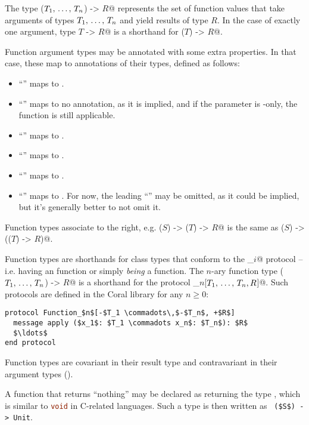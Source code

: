 The type \lstinline@($T_1 ,\, \ldots ,\, T_n$) -> $R$@ represents the set of function values that take arguments of types $T_1 ,\, \ldots ,\, T_n$ and yield results of type $R$. In the case of exactly one argument, type \lstinline@$T$ -> $R$@ is a shorthand for \lstinline@($T$) -> $R$@. 

Function argument types may be annotated with some extra properties. In that case, these map to annotations of their types, defined as follows:
\begin{itemize}
\item ``'' maps to . 
\item ``'' maps to no annotation, as it is implied, and if the parameter is -only, the function is still applicable. 
\item ``\code{*}'' maps to . 
\item ``\code{**}'' maps to . 
\item ``\code{&}'' maps to . 
\item ``\code{^$\id$}'' maps to . For now, the leading ``\code{^}'' may be omitted, as it could be implied, but it's generally better to not omit it. 
\end{itemize}

Function types associate to the right, e.g. \lstinline@($S$) -> ($T$) -> $R$@ is the same as \lstinline@($S$) -> (($T$) -> $R$)@. 

Function types are shorthands for class types that conform to the \lstinline@Function_$i$@ protocol -- i.e. having an  function or simply {\em being} a function. The $n$-ary function type \lstinline@($T_1 ,\, \ldots ,\, T_n$) -> $R$@ is a shorthand for the protocol \lstinline@Function_$n$[$T_1 ,\, \ldots ,\, T_n,R$]@. Such protocols are defined in the Coral library for any $n \ge 0$:

\begin{lstlisting}
protocol Function_$n$[-$T_1 \commadots\,$-$T_n$, +$R$]
  message apply ($x_1$: $T_1 \commadots x_n$: $T_n$): $R$
  $\ldots$
end protocol
\end{lstlisting}

Function types are covariant in their result type and contravariant in their argument types ().

A function that returns ``nothing'' may be declared as returning the type , which is similar to \lstinline[language=C]!void! in C-related languages. Such a type is then written as ~\lstinline!($S$) -> Unit!. 

